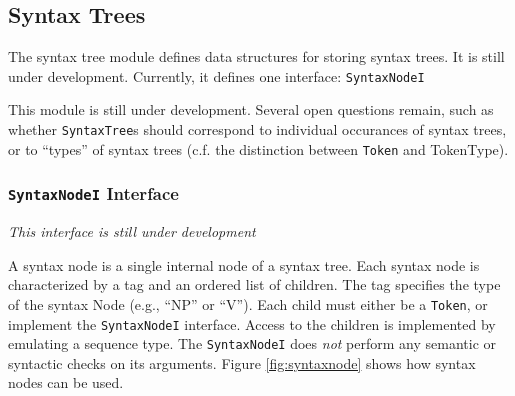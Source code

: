 \documentclass{article}
\begin{document}
\subsection{Syntax Trees}

The syntax tree module defines data structures for storing syntax
trees.  It is still under development.  Currently, it defines one
interface: \texttt{SyntaxNodeI}

This module is still under development.  Several open questions
remain, such as whether \texttt{SyntaxTree}s should correspond to
individual occurances of syntax trees, or to ``types'' of syntax trees
(c.f. the distinction between \texttt{Token} and TokenType).

\subsubsection{\texttt{SyntaxNodeI} Interface}

\emph{This interface is still under development}

A syntax node is a single internal node of a syntax tree.  Each syntax
node is characterized by a tag and an ordered list of children.  The
tag specifies the type of the syntax Node (e.g., ``NP'' or ``V'').
Each child must either be a \texttt{Token}, or implement the
\texttt{SyntaxNodeI} interface.  Access to the children is implemented
by emulating a sequence type.  The \texttt{SyntaxNodeI} does
\emph{not} perform any semantic or syntactic checks on its arguments.
Figure \ref{fig:syntaxnode} shows how syntax nodes can be used.
\end{document}
